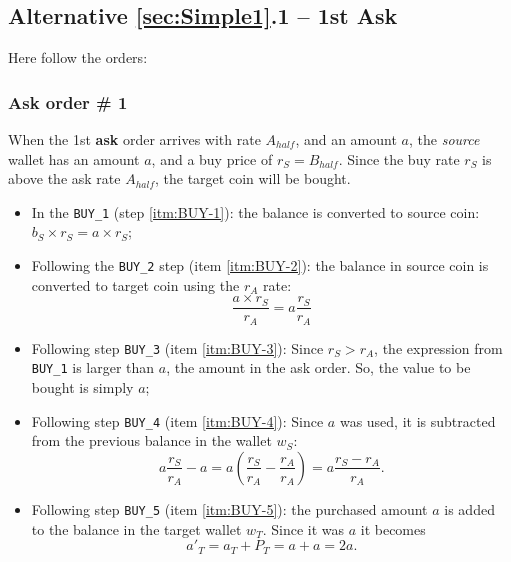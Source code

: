 \documentclass[a4paper,11pt]{article}
\begin{document}
\subsection{Alternative \ref{sec:Simple1}.1 -- 1st Ask}

Here follow the orders:

\subsubsection{Ask order \# 1} 

When the 1st {\bf ask} order arrives with rate $A_{half}$, and an amount $a$, the {\em source} 
wallet has an amount $a$, and a buy price of $r_S = B_{half}$. Since the buy rate $r_S$ is above the 
ask rate $A_{half}$, the target coin will be bought.
	
\begin{itemize}
    \item  In the {\tt BUY\_1} (step \ref{itm:BUY-1}): the balance is converted to 
	source coin: $b_S \times r_S = a \times r_S$;
		
    \item Following the {\tt BUY\_2} step (item \ref{itm:BUY-2}): the balance in 
	source coin is converted to target coin using the $r_A$ rate:
	\begin{equation*}
	    \frac{a \times r_S}{r_A} = a \frac{r_S}{r_A}
	\end{equation*}
			
    \item Following step {\tt BUY\_3} (item \ref{itm:BUY-3}):
	Since $r_S > r_A$, the expression from {\tt BUY\_1} is larger than $a$, the amount
	in the ask order. So, the value to be bought is simply $a$; 
	
    \item Following step {\tt BUY\_4} (item \ref{itm:BUY-4}): Since $a$ was used, it is
	subtracted from the previous balance in the wallet $w_S$:
	\begin{equation*}
	    a \frac{r_S}{r_A} - a = a \left( \frac{r_S}{r_A} - \frac{r_A}{r_A} \right) 
		                  = a \frac{r_S - r_A}{r_A}.
	\end{equation*}
		
    \item Following step {\tt BUY\_5} (item \ref{itm:BUY-5}):
	the purchased amount $a$ is added to the balance in the target wallet $w_T$. Since
	it was $a$ it becomes
	\begin{equation*}
	    a'_T = a_T + P_T = a + a = 2a.
	\end{equation*}
		
    \end{itemize}
	
\end{document}
